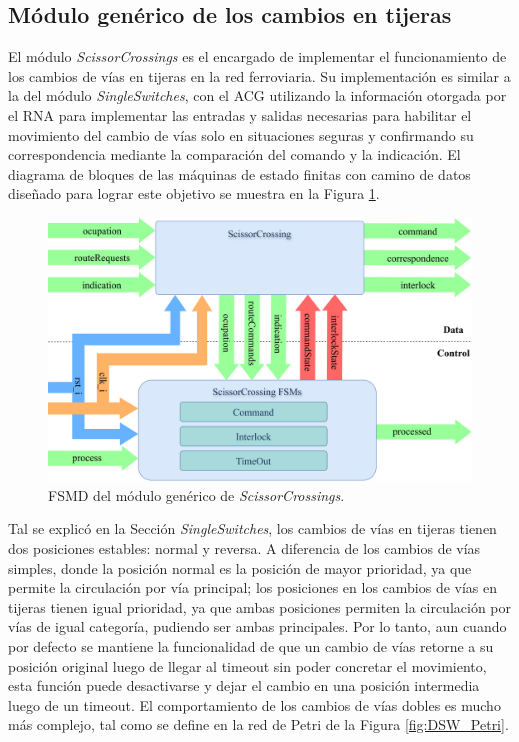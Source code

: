\subsection{Módulo genérico de los cambios en tijeras}

El módulo \textit{ScissorCrossings} es el encargado de implementar el funcionamiento de los cambios de vías en tijeras en la red ferroviaria. Su implementación es similar a la del módulo \textit{SingleSwitches}, con el ACG utilizando la información otorgada por el RNA para implementar las entradas y salidas necesarias para habilitar el movimiento del cambio de vías solo en situaciones seguras y confirmando su correspondencia mediante la comparación del comando y la indicación. El diagrama de bloques de las máquinas de estado finitas con camino de datos diseñado para lograr este objetivo se muestra en la Figura \ref{fig:SCR_module}.

\begin{figure}[H]
	\centering
	\includegraphics[width=1\textwidth]{Figuras/SCR_module}
	\centering\caption{FSMD del módulo genérico de \textit{ScissorCrossings}.}
	\label{fig:SCR_module}
\end{figure}

Tal se explicó en la Sección \textit{SingleSwitches}, los cambios de vías en tijeras tienen dos posiciones estables: normal y reversa. A diferencia de los cambios de vías simples, donde la posición normal es la posición de mayor prioridad, ya que permite la circulación por vía principal; los posiciones en los cambios de vías en tijeras tienen igual prioridad, ya que ambas posiciones permiten la circulación por vías de igual categoría, pudiendo ser ambas principales. Por lo tanto, aun cuando por defecto se mantiene la funcionalidad de que un cambio de vías retorne a su posición original luego de llegar al timeout sin poder concretar el movimiento, esta función puede desactivarse y dejar el cambio en una posición intermedia luego de un timeout. El comportamiento de los cambios de vías dobles es mucho más complejo, tal como se define en la red de Petri de la Figura \ref{fig:DSW_Petri}.

